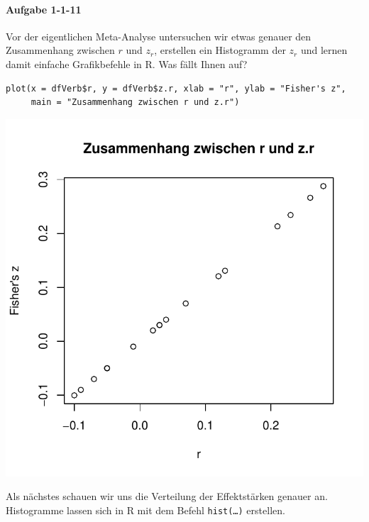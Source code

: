 \documentclass[normalheadings, 10pt]{scrartcl}\usepackage{graphicx, color}
\makeatletter
\def\maxwidth{ %
  \ifdim\Gin@nat@width>\linewidth
    \linewidth
  \else
    \Gin@nat@width
  \fi
}
\newenvironment{kframe}{%
 \def\at@end@of@kframe{}%
 \ifinner\ifhmode%
  \def\at@end@of@kframe{\end{minipage}}%
  \begin{minipage}{\columnwidth}%
 \fi\fi%
 \def\FrameCommand##1{\hskip\@totalleftmargin \hskip-\fboxsep
 \colorbox{shadecolor}{##1}\hskip-\fboxsep
     \hskip-\linewidth \hskip-\@totalleftmargin \hskip\columnwidth}%
 \MakeFramed {\advance\hsize-\width
   \@totalleftmargin\z@ \linewidth\hsize
   \@setminipage}}%
 {\par\unskip\endMakeFramed%
 \at@end@of@kframe}
\newenvironment{knitrout}{}{} %
\newcommand{\code}[1]{\texttt{#1}}
\makeatother
\begin{document}
\paragraph{Aufgabe 1-1-11} Vor der eigentlichen Meta-Analyse untersuchen wir
etwas genauer den Zusammenhang zwischen $r$ und $z_r$, erstellen ein Histogramm
der $z_r$ und lernen damit einfache Grafikbefehle in R. Was fällt Ihnen auf?

\begin{rbsp}
\begin{knitrout}
\color{fgcolor}\begin{kframe}
\begin{verbatim}
plot(x = dfVerb$r, y = dfVerb$z.r, xlab = "r", ylab = "Fisher's z",
     main = "Zusammenhang zwischen r und z.r")
\end{verbatim}
\end{kframe}
\includegraphics[width=\maxwidth]{fig/assign-1-1-11_1} 

\end{knitrout}

\end{rbsp}

\pagebreak

Als nächstes schauen wir uns die Verteilung der Effektstärken genauer
an. Histogramme lassen sich in R mit dem Befehl \code{hist(\ldots)} erstellen.
\end{document}
